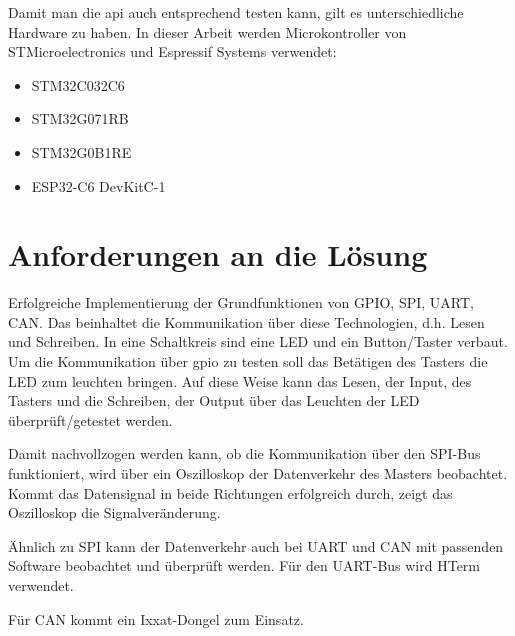 Damit man die \gls{api} auch entsprechend testen kann, gilt es unterschiedliche Hardware zu haben.
In dieser Arbeit werden Microkontroller von STMicroelectronics und Espressif Systems verwendet:

\begin{itemize}
	\item STM32C032C6
	\item STM32G071RB
	\item STM32G0B1RE
	\item ESP32-C6 DevKitC-1
\end{itemize}


\section{Anforderungen an die Lösung}
Erfolgreiche Implementierung der Grundfunktionen von GPIO, SPI, UART, CAN. 
Das beinhaltet die Kommunikation über diese Technologien, d.h. Lesen und Schreiben.
In eine Schaltkreis sind eine LED und ein Button/Taster verbaut. 
Um die Kommunikation über \gls{gpio} zu testen soll das Betätigen des Tasters die LED zum leuchten bringen.
Auf diese Weise kann das Lesen, der Input, des Tasters und die Schreiben, der Output über das Leuchten der LED überprüft/getestet werden.

Damit nachvollzogen werden kann, ob die Kommunikation über den SPI-Bus funktioniert, 
wird über ein Oszilloskop der Datenverkehr des Masters beobachtet. 
Kommt das Datensignal in beide Richtungen erfolgreich durch, zeigt das Oszilloskop die Signalveränderung.

Ähnlich zu SPI kann der Datenverkehr auch bei UART und CAN mit passenden Software beobachtet und überprüft werden.
Für den UART-Bus wird HTerm verwendet. %

Für CAN kommt ein Ixxat-Dongel zum Einsatz. %



























